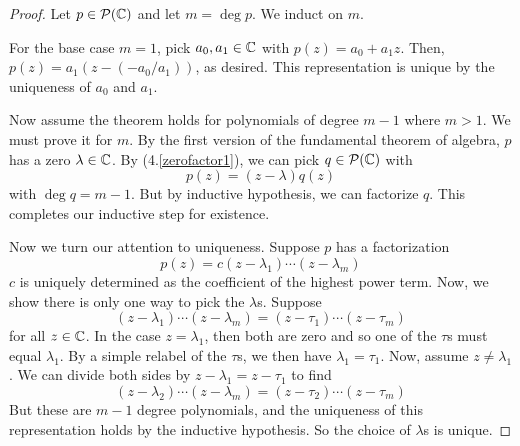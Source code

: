 \begin{proof}
    Let $p\in\mathcal{P}(\mathbb{C})$ and let $m=\deg p$. We induct on $m$. 

    For the base case $m=1$, pick $a_0,a_1\in \mathbb{C}$ with $p(z) = a_0 + a_1z$. Then, $p(z) = a_1(z - (-a_0/a_1))$, as desired. This representation is unique by the uniqueness of $a_0$ and $a_1$.

    Now assume the theorem holds for polynomials of degree $m-1$ where $m>1$. We must prove it for $m$. By the first version of the fundamental theorem of algebra, $p$ has a zero $\lambda\in\mathbb{C}$. By (4.\ref{zerofactor1}), we can pick $q\in\mathcal{P}(\mathbb{C})$ with
    \[ p(z) = (z-\lambda)q(z)\]
    with $\deg q = m-1$. But by inductive hypothesis, we can factorize $q$. This completes our inductive step for existence.

    Now we turn our attention to uniqueness. Suppose $p$ has a factorization
    \[ p(z) = c(z-\lambda_1)\cdots(z-\lambda_m) \]
    $c$ is uniquely determined as the coefficient of the highest power term. Now, we show there is only one way to pick the $\lambda$s. Suppose
    \[ (z-\lambda_1)\cdots(z-\lambda_m) = (z-\tau_1)\cdots(z-\tau_m) \]
    for all $z\in\mathbb{C}$. In the case $z = \lambda_1$, then both are zero and so one of the $\tau$s must equal $\lambda_1$. By a simple relabel of the $\tau$s, we then have $\lambda_1 = \tau_1$. Now, assume $z \ne \lambda_1$. We can divide both sides by $z-\lambda_1 = z-\tau_1$ to find
    \[ (z-\lambda_2)\cdots(z-\lambda_m) = (z-\tau_2)\cdots(z-\tau_m) \]
    But these are $m-1$ degree polynomials, and the uniqueness of this representation holds by the inductive hypothesis. So the choice of $\lambda$s is unique. 
\end{proof}
